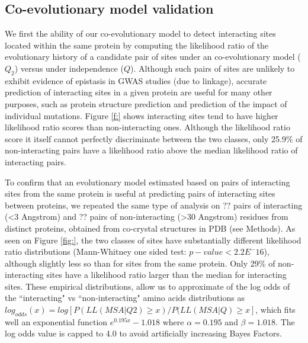 \subsection{Co-evolutionary model validation}

We first the ability of our co-evolutionary model to detect interacting sites located within the same protein by computing the likelihood ratio of the evolutionary history of a candidate pair of sites under an co-evolutionary model ($Q_2$) versus under independence ($Q$). Although such pairs of sites are unlikely to exhibit evidence of epistasis in GWAS studies (due to linkage), accurate prediction of interacting sites in a given protein are useful for many other purposes, such as protein structure prediction and prediction of the impact of individual mutations.  Figure \ref{f:} shows interacting sites tend to have higher likelihood ratio scores than non-interacting ones. Although the likelihood ratio score it itself cannot perfectly discriminate between the two classes, only 25.9\% of non-interacting pairs have a likelihood ratio above the median likelihood ratio of interacting pairs. 


To confirm that an evolutionary model estimated based on pairs of interacting sites from the same protein is useful at predicting pairs of interacting sites between proteins, we repeated the same type of analysis on ?? pairs of interacting (<3 Angstrom) and ?? pairs of non-interacting (>30 Angstrom) residues from distinct proteins, obtained from co-crystal structures in PDB (see Methods). As seen on Figure \ref{fig:}, the two classes of sites have substantially different likelihood ratio distributions (Mann-Whitney one sided test: $p-value < 2.2E^-{16}$), although slightly less so than for sites from the same protein. Only 29\% of non-interacting sites have a likelihood ratio larger than the median for interacting sites. These empirical distributions, allow us to approximate of the log odds of the “interacting" vs “non-interacting" amino acids distributions as $log_{odds}(x) = log[P(LL(MSA|Q2) \ge x) / P(LL(MSA|Q) \ge x]$, which fits well an exponential function $e^{0.195 x}-1.018$ where $\alpha = 0.195$ and $\beta = 1.018$. The log odds value is capped to 4.0 to avoid artificially increasing Bayes Factors. 


